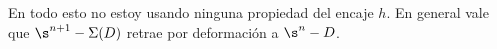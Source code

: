 En todo esto no estoy usando ninguna propiedad del encaje $h$. En general vale que $\s^{n+1}-\Sigma(D)$ retrae por deformación a $\s^n -D$.







